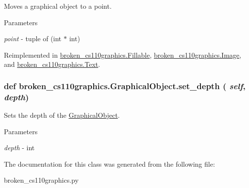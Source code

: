 Moves a graphical object to a point. 
\begin{DoxyParams}{Parameters}
\item[{\em point}]-\/ tuple of (int $\ast$ int) \end{DoxyParams}


Reimplemented in \hyperlink{classbroken__cs110graphics_1_1Fillable_ae7f8de11eb7e2fa1cebea3e978e1c3f0}{broken\_\-cs110graphics.Fillable}, \hyperlink{classbroken__cs110graphics_1_1Image_a4070f6da8af60ef25ed9e0f8791cf920}{broken\_\-cs110graphics.Image}, and \hyperlink{classbroken__cs110graphics_1_1Text_a7125cca1813d3cf1f3177b736c5f7b92}{broken\_\-cs110graphics.Text}.\hypertarget{classbroken__cs110graphics_1_1GraphicalObject_a44da58c2cea9721452c03b460d978ab6}{
\subsubsection[{set\_\-depth}]{\setlength{\rightskip}{0pt plus 5cm}def broken\_\-cs110graphics.GraphicalObject.set\_\-depth ( {\em self}, \/   {\em depth})}}
\label{classbroken__cs110graphics_1_1GraphicalObject_a44da58c2cea9721452c03b460d978ab6}


Sets the depth of the \hyperlink{classbroken__cs110graphics_1_1GraphicalObject}{GraphicalObject}. 
\begin{DoxyParams}{Parameters}
\item[{\em depth}]-\/ int \end{DoxyParams}


The documentation for this class was generated from the following file:\begin{DoxyCompactItemize}
\item 
broken\_\-cs110graphics.py\end{DoxyCompactItemize}
